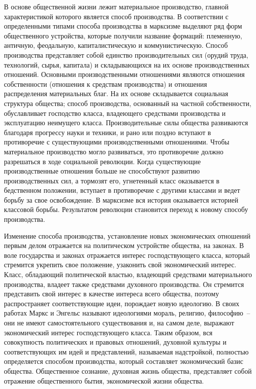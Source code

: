 В основе общественной жизни лежит материальное производство, главной характеристикой которого
является способ производства. В соответствии с определенными типами способа производства в марксизме
выделяют ряд форм общественного устройства, которые получили название формаций: племенную, античную,
феодальную, капиталистическую и коммунистическую. Способ производства представляет собой единство
производительных сил (орудий труда, технологий, сырья, капитала) и складывающихся на их основе
производственных отношений. Основными производственными отношениями являются отношения собственности
(отношения к средствам производства) и отношения распределения материальных благ. На их основе
складывается социальная структура общества; способ производства, основанный на частной
собственности, обуславливает господство класса, владеющего средствами производства и эксплуатацию
неимущего класса. Производительные силы общества развиваются благодаря прогрессу науки и техники, и
рано или поздно вступают в противоречие с существующими производственными отношениями. Чтобы
материальное производство могло развиваться, это противоречие должно разрешаться в ходе социальной
революции. Когда существующие производственные отношения больше не способствуют развитию
производственных сил, а тормозят его, угнетенный класс оказывается в бедственном положении, вступает
в противоречие с другими классами и ведет борьбу за свое освобождение. В марксизме вся история
оказывается историей классовой борьбы. Результатом революции становится переход к новому способу
производства.

Изменение способа производства, установление новых экономических отношений первым делом отражается
на политическом устройстве общества, на законах. В воле государства и законах отражается интерес
господствующего класса, который стремится укрепить свое положение, узаконить свой экономический
интерес. Класс, обладающий политической властью, владеющий средствами материального производства,
владеет также средствами духовного производства. Он стремится представить свой интерес в качестве
интереса всего общества, поэтому распространяет соответствующие идеи, порождает новую идеологию. В
своих работах Маркс и Энгельс называют идеологиями мораль, религию, философию~-- они не имеют
самостоятельного существования и, на самом деле, выражают экономический интерес господствующего
класса. Таким образом, вся совокупность политических и правовых отношений, духовной культуры и
соответствующих им идей и представлений, называемая надстройкой, полностью определяется способом
производства, который составляет экономический базис общества. Общественное сознание, духовная жизнь
общества, представляет собой отражение общественного бытия, экономической жизни общества.

